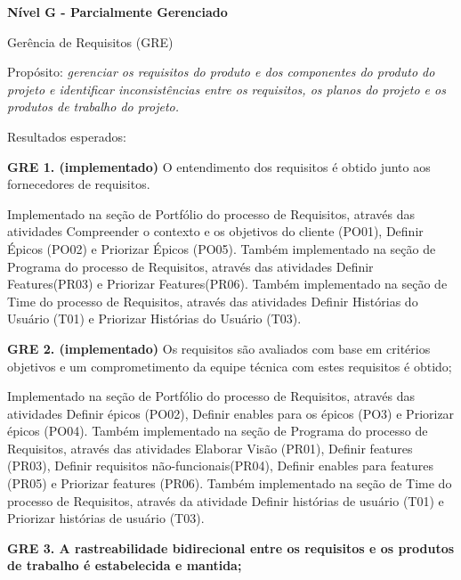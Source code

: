 \begin {enumerate}
{\item {\large \textbf{Nível G - Parcialmente Gerenciado \\}}}

\begin  {itemize}
{\item {Gerência de Requisitos (GRE)}}

{\tab Propósito: \textit{gerenciar os requisitos do produto e dos componentes do produto do projeto e identificar inconsistências entre os requisitos, os planos do projeto e os produtos de trabalho do projeto.\\}}

{Resultados esperados:\\}

{\item \textbf{GRE 1. (implementado)} O entendimento dos requisitos é obtido junto aos fornecedores de requisitos.}

Implementado na seção de Portfólio do processo de Requisitos, através das atividades Compreender o contexto e os objetivos do cliente (PO01), Definir Épicos (PO02) e Priorizar Épicos (PO05).
Também implementado na seção de Programa do processo de Requisitos, através das atividades Definir Features(PR03) e Priorizar Features(PR06).
Também implementado na seção de Time do processo de Requisitos, através das atividades Definir Histórias do Usuário (T01) e Priorizar Histórias do Usuário (T03).

{\item \textbf{GRE 2. (implementado)} Os requisitos são avaliados com base em critérios objetivos e um comprometimento da equipe técnica com estes requisitos é obtido;}

Implementado na seção de Portfólio do processo de Requisitos, através das atividades Definir épicos (PO02), Definir enables para os épicos (PO3) e Priorizar épicos (PO04).
Também implementado na seção de Programa do processo de Requisitos, através das atividades Elaborar Visão (PR01), Definir features (PR03), Definir requisitos não-funcionais(PR04), Definir enables para features (PR05) e Priorizar features (PR06).
Também implementado na seção de Time do processo de Requisitos, através da atividade Definir histórias de usuário (T01) e Priorizar histórias de usuário (T03).

{\item \textbf{GRE 3. A rastreabilidade bidirecional entre os requisitos e os produtos de trabalho é estabelecida e mantida;}}


\end{itemize}
\end{enumerate}
